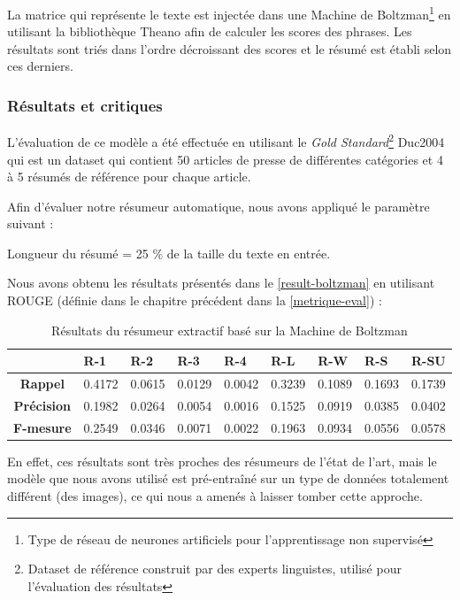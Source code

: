     La matrice qui représente le texte est injectée dans une Machine de Boltzman\footnote{Type de réseau de neurones artificiels pour l'apprentissage non supervisé} en utilisant la bibliothèque Theano \cite{theano} afin de calculer les scores des phrases. Les résultats sont triés dans l'ordre décroissant des scores et le résumé est établi selon ces derniers.\\
    
    \subsubsection{Résultats et critiques}
    L'évaluation de ce modèle a été effectuée en utilisant le \emph{Gold Standard}\footnote{Dataset de référence construit par des experts linguistes, utilisé pour l'évaluation des résultats} Duc2004 qui est un dataset qui contient 50 articles de presse de différentes catégories et 4 à 5 résumés de référence pour chaque article.
    
    Afin d'évaluer notre résumeur automatique, nous avons appliqué le paramètre suivant :
    
    Longueur du résumé = 25 \% de la taille du texte en entrée.
    
    Nous avons obtenu les résultats présentés dans le \autoref{result-boltzman} en utilisant ROUGE (définie dans le chapitre précédent dans la \autoref{metrique-eval}) : 
    \begin{table}[H]
        \begin{center}
            \begin{tabular}{|c|C{1.2cm}|C{1.2cm}|C{1.2cm}|C{1.2cm}|C{1.2cm}|C{1.2cm}|C{1.2cm}|C{1.2cm}|}
                 & \textbf{R-1} &  \textbf{R-2} &  \textbf{R-3} &  \textbf{R-4} &  \textbf{R-L} &  \textbf{R-W} &  \textbf{R-S} &  \textbf{R-SU} \\
                \hline
                \textbf{Rappel} & 0.4172 & 0.0615 & 0.0129 & 0.0042 & 0.3239 & 0.1089 & 0.1693 & 0.1739 \\
                \textbf{Précision} & 0.1982 & 0.0264 & 0.0054 & 0.0016 & 0.1525 & 0.0919 & 0.0385 & 0.0402 \\
                \textbf{F-mesure} & 0.2549 & 0.0346 & 0.0071 & 0.0022 & 0.1963 & 0.0934 & 0.0556 & 0.0578 \\
                \hline
            \end{tabular}
        \end{center}
        \caption{Résultats du résumeur extractif basé sur la Machine de Boltzman}
        \label{result-boltzman}
    \end{table}
    En effet, ces résultats sont très proches des résumeurs de l'état de l'art, mais le modèle que nous avons utilisé est pré-entraîné sur un type de données totalement différent (des images), ce qui nous a amenés à laisser tomber cette approche.   

